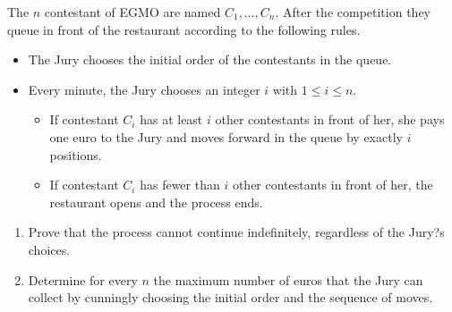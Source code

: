 The $n$ contestant of EGMO are named $C_1,\ldots,C_n$. After the competition they queue in front of the restaurant according to the following rules.
\begin{itemize}
	\item The Jury chooses the initial order of the contestants in the queue.
	\item Every minute, the Jury chooses an integer $i$ with $1\leq i\leq n$.
	\begin{itemize}
		\item If contestant $C_i$ has at least $i$ other contestants in front of her, she pays one euro to the Jury and moves forward in the queue by exactly $i$ positions.
		\item If contestant $C_i$ has fewer than $i$ other contestants in front of her, the restaurant opens and the process ends.
	\end{itemize}
\end{itemize}
\begin{enumerate}[label=(\alph*)]
	\item Prove that the process cannot continue indefinitely, regardless of the Jury?s choices.
	\item Determine for every $n$ the maximum number of euros that the Jury can collect by cunningly choosing the initial order and the sequence of moves.
\end{enumerate}